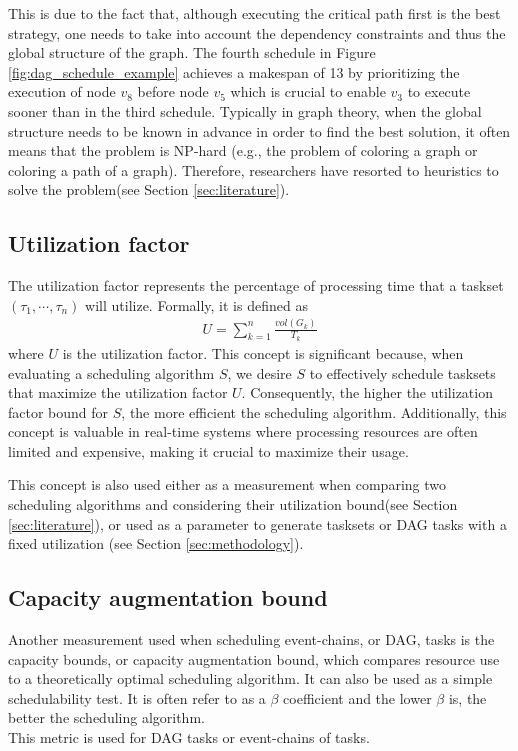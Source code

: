 This is due to the fact that, although executing the critical path first
is the best strategy\cite{zhao2020DAGsched}, 
one needs to take into account the dependency constraints
and thus the global structure of the graph.
The fourth schedule in Figure \ref{fig:dag_schedule_example}
achieves a makespan of 13 by prioritizing the execution of node $v_8$
before node $v_5$ which is crucial to enable $v_3$ to execute sooner
than in the third schedule.
Typically in graph theory, when the global structure needs to be known 
in advance
in order to find the best solution, it often means that the problem is NP-hard
(e.g., the problem of coloring a graph\cite{book1975richardNPhardColorGraph}
or coloring a path of a graph\cite{ERLEBACH2001ColorPathNPhard}).
Therefore, researchers have resorted to heuristics to solve the problem(see Section \ref{sec:literature}).


\subsection{Utilization factor}

The utilization factor represents the percentage of processing 
time that a taskset $(\tau_1, \cdots, \tau_n)$ will utilize. 
Formally, it is defined as
\begin{align}
U = \sum_{k=1}^{n} \frac{vol(G_k)}{T_k}
\end{align}
where $U$ is the utilization factor. This concept is significant 
because, when evaluating a scheduling algorithm $S$, we desire 
$S$ to effectively schedule tasksets that maximize the utilization 
factor $U$. Consequently, the higher the utilization factor bound 
for $S$, the more efficient the scheduling algorithm. Additionally, 
this concept is valuable in real-time systems where processing 
resources are often limited and expensive, making it crucial to 
maximize their usage.

This concept is also used either as a measurement
when comparing two scheduling algorithms 
and considering their utilization bound(see Section \ref{sec:literature}),
or used as a parameter to generate tasksets or DAG tasks with 
a fixed utilization (see Section \ref{sec:methodology}).

\subsection{Capacity augmentation bound}

Another measurement used when scheduling event-chains, or DAG, tasks  
is the capacity bounds, or capacity augmentation bound,
which compares resource use to a theoretically optimal scheduling algorithm.
It can also be used as a simple schedulability test.
It is often refer to as a $\beta$ coefficient and the lower $\beta$ is, the better the scheduling algorithm.\\
This metric is used for DAG tasks or event-chains of tasks.

